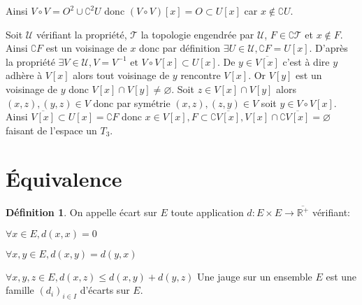 \documentclass[a4paper, 11pt, french]{book}
\newenvironment{itemise}{\itemize}{\enditemize}
\theoremstyle{plain} %
\theoremstyle{definition} %
\newtheorem{definition}{Définition}
\theoremstyle{remark} %
\newcommand{\1}{\mathds{1}}
\newcommand\vide{\varnothing}
\newcommand{\inv}[1]{#1^{-1}}
\newcommand\et{\text{ et }}
\newcommand{\R}{\mathbb{R}}
\newcommand{\scr}[1]{\mathscr{#1}}
\begin{document}
{\begin{center}
	\end{center}
	Ainsi $V\circ V=O^2\cup\complement^2 U$ donc $(V\circ V)[x]=O\subset U[x]$ car $x\notin\complement U$.
}{
	Soit $\scr{U}$ vérifiant la propriété, $\scr{T}$ la topologie engendrée par $\scr{U}$, $F\in\complement\scr{T}$ et $x\notin F$.
	Ainsi $\complement F$ est un voisinage de $x$ donc par définition $\exists U\in\scr{U}, \complement F=U[x]$.
	D'après la propriété $\exists V\in\scr{U}, V=\inv{V}\et V\circ V[x]\subset U[x]$.
	De $y\in\overline{V[x]}$ c'est à dire $y$ adhère à $V[x]$ alors tout voisinage de $y$ rencontre $V[x]$.
	Or $V[y]$ est un voisinage de $y$ donc $V[x]\cap V[y]\neq\vide$.
	Soit $z\in V[x]\cap V[y]$ alors $(x, z), (y, z)\in V$ donc par symétrie $(x, z), (z, y)\in V$ soit $y\in V\circ V[x]$.
	Ainsi $\overline{V[x]}\subset U[x]=\complement F$ donc $x\in V[x], F\subset\complement\overline{V[x]}, V[x]\cap\complement\overline{V[x]}=\vide$ faisant de l'espace un $T_3$.	
}

\section{Équivalence}

\begin{definition}
	On appelle écart sur $E$ toute application $d:E\times E\rightarrow\overline{\R^+}$ vérifiant:
	\begin{itemise}
		\item $\forall x\in E, d(x, x)=0$
		\item $\forall x, y\in E, d(x, y)=d(y, x)$
		\item $\forall x, y, z\in E, d(x, z)\leqslant d(x, y)+d(y, z)$
	\end{itemise}
	Une jauge sur un ensemble $E$ est une famille $(d_i)_{i\in I}$ d'écarts sur $E$.
\end{definition}
\end{document}
